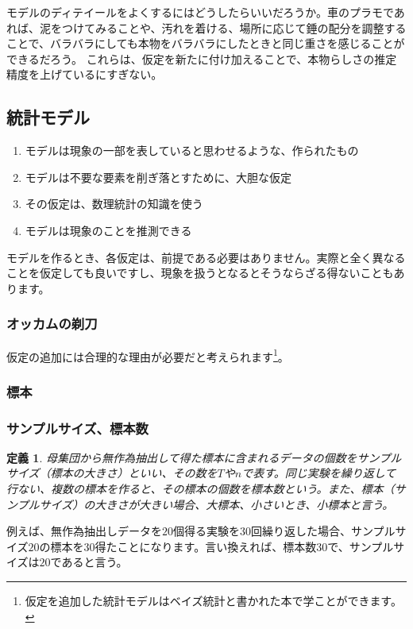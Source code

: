 \documentclass[a4paper,11pt,dvipdfmx]{jsarticle}
\newtheorem{defi}{定義}[section]
\begin{document}
モデルのディテイールをよくするにはどうしたらいいだろうか。車のプラモであれば、泥をつけてみることや、汚れを着ける、場所に応じて錘の配分を調整することで、バラバラにしても本物をバラバラにしたときと同じ重さを感じることができるだろう。
これらは、仮定を新たに付け加えることで、本物らしさの推定精度を上げているにすぎない。


\subsection{統計モデル}
\begin{enumerate}
    \item モデルは現象の一部を表していると思わせるような、作られたもの
    \item モデルは不要な要素を削ぎ落とすために、大胆な仮定
    \item その仮定は、数理統計の知識を使う
    \item モデルは現象のことを推測できる
\end{enumerate}

モデルを作るとき、各仮定は、前提である必要はありません。実際と全く異なることを仮定しても良いですし、現象を扱うとなるとそうならざる得ないこともあります。
\subsubsection{オッカムの剃刀}

仮定の追加には合理的な理由が必要だと考えられます\footnote{仮定を追加した統計モデルはベイズ統計と書かれた本で学ことができます。}。

\begin{figure}
    \begin{center}
%
\end{center}
\end{figure}

\subsubsection{標本}


\subsubsection{サンプルサイズ、標本数}
\begin{defi}
母集団から無作為抽出して得た標本に含まれるデータの個数をサンプルサイズ（標本の大きさ）といい、その数を$T$や$n$で表す。同じ実験を繰り返して行ない、複数の標本を作ると、その標本の個数を標本数という。また、標本（サンプルサイズ）の大きさが大きい場合、大標本、小さいとき、小標本と言う。
\end{defi}
例えば、無作為抽出しデータを$20$個得る実験を30回繰り返した場合、サンプルサイズ$20$の標本を$30$得たことになります。言い換えれば、標本数$30$で、サンプルサイズは$20$であると言う。
\end{document}
